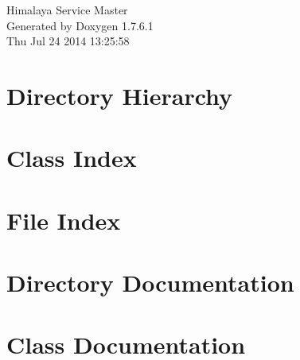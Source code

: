 \documentclass[a4paper]{book}
\begin{document}
\hypersetup{pageanchor=false,citecolor=blue}
\begin{titlepage}
\vspace*{7cm}
\begin{center}
{\Large \-Himalaya \-Service \-Master }\\
\vspace*{1cm}
{\large \-Generated by Doxygen 1.7.6.1}\\
\vspace*{0.5cm}
{\small Thu Jul 24 2014 13:25:58}\\
\end{center}
\end{titlepage}
\clearemptydoublepage
{}
\tableofcontents
\clearemptydoublepage
{}
\hypersetup{pageanchor=true,citecolor=blue}
\chapter{\-Directory \-Hierarchy}

\chapter{\-Class \-Index}

\chapter{\-File \-Index}

\chapter{\-Directory \-Documentation}





\chapter{\-Class \-Documentation}
















\end{document}
